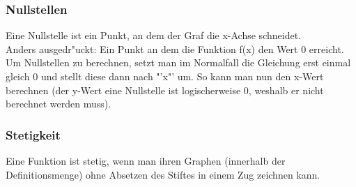 \subsubsection{Nullstellen}
Eine Nullstelle ist ein Punkt, an dem der Graf die x-Achse schneidet.\\
Anders ausgedr"uckt: Ein Punkt an dem die Funktion f(x) den Wert 0 erreicht.\\
Um Nullstellen zu berechnen, setzt man im Normalfall die Gleichung erst einmal gleich 0 und stellt diese dann nach "'x"' um. So kann man nun den x-Wert berechnen (der y-Wert eine Nullstelle ist logischerweise 0, weshalb er nicht berechnet werden muss).

\subsubsection{Stetigkeit}
Eine Funktion ist stetig, wenn man ihren Graphen (innerhalb der Definitionsmenge) ohne Absetzen des Stiftes in einem Zug zeichnen kann.